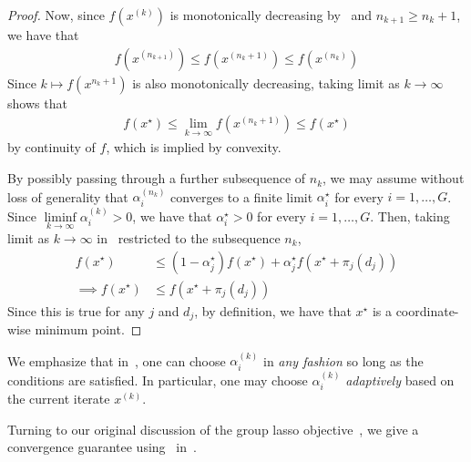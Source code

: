 \begin{proof}
Now, since $f(x^{(k)})$ is monotonically decreasing by~
and $n_{k+1} \geq n_k+1$,
we have that
\begin{align*}
    f(x^{(n_{k+1})}) \leq f(x^{(n_k+1)}) \leq f(x^{(n_k)})
\end{align*}
Since $k\mapsto f(x^{n_k+1})$ is also monotonically decreasing,
taking limit as $k\to\infty$ shows that
\begin{align*}
    f(x^\star) \leq \lim\limits_{k\to\infty} f(x^{(n_k+1)}) \leq f(x^\star)
\end{align*}
by continuity of $f$, which is implied by convexity.

By possibly passing through a further subsequence of $n_k$,
we may assume without loss of generality that $\alpha_i^{(n_k)}$ converges
to a finite limit $\alpha_i^\star$ for every $i=1,\ldots, G$.
Since $\liminf\limits_{k\to\infty} \alpha_i^{(k)} > 0$,
we have that $\alpha_i^\star > 0$ for every $i=1,\ldots, G$.
Then, taking limit as $k\to\infty$ in~
restricted to the subsequence $n_k$,
\begin{align*}
    f(x^\star)
    &\leq 
    (1-\alpha_j^\star) f(x^\star)
    + \alpha_j^\star f(x^\star + \pi_j(d_j))
    \\ \implies
    f(x^\star)
    &\leq
    f(x^\star + \pi_j(d_j))
\end{align*}
Since this is true for any $j$ and $d_j$,
by definition, we have that $x^\star$ is a coordinate-wise minimum point.
\end{proof}

We emphasize that in~,
one can choose $\alpha_i^{(k)}$ 
in \emph{any fashion} so long as the conditions are satisfied.
In particular, one may choose $\alpha_i^{(k)}$ \emph{adaptively} based on the current iterate $x^{(k)}$.

Turning to our original discussion of the group lasso objective~,
we give a convergence guarantee using~ in~. 

